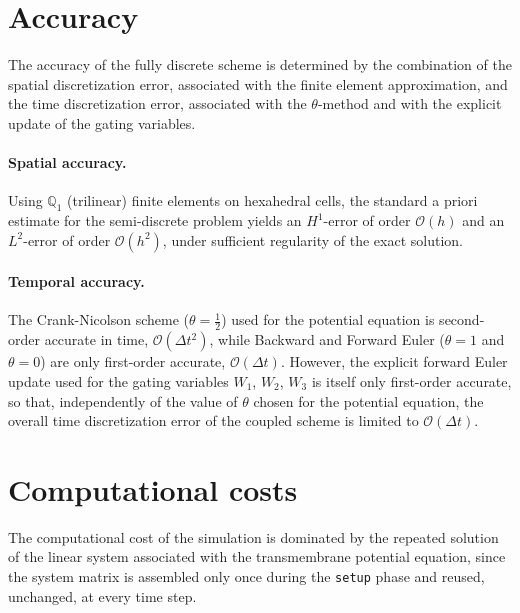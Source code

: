 \documentclass{Configuration_Files/PoliMi3i_thesis}
\begin{document}
\section{Accuracy}
The accuracy of the fully discrete scheme is determined by the combination of the spatial
discretization error, associated with the finite element approximation, and the time
discretization error, associated with the $\theta$-method and with the explicit update of
the gating variables.

\paragraph{Spatial accuracy.}
Using $\mathbb{Q}_1$ (trilinear) finite elements on hexahedral cells, the standard a
priori estimate for the semi-discrete problem yields an $H^1$-error of order
$\mathcal{O}(h)$ and an $L^2$-error of order $\mathcal{O}(h^2)$, under sufficient
regularity of the exact solution.

\paragraph{Temporal accuracy.}
The Crank-Nicolson scheme ($\theta = \tfrac{1}{2}$) used for the potential equation is
second-order accurate in time, $\mathcal{O}(\Delta t^2)$, while Backward and Forward
Euler ($\theta = 1$ and $\theta = 0$) are only first-order accurate,
$\mathcal{O}(\Delta t)$. However, the explicit forward Euler update used for the gating
variables $W_1$, $W_2$, $W_3$ is itself only first-order accurate, so that, independently of the
value of $\theta$ chosen for the potential equation, the overall time discretization
error of the coupled scheme is limited to $\mathcal{O}(\Delta t)$.

\section{Computational costs}
The computational cost of the simulation is dominated by the repeated solution of the
linear system associated with the transmembrane potential equation, since the system
matrix is assembled only once during the \texttt{setup} phase and reused, unchanged, at
every time step.
\end{document}

